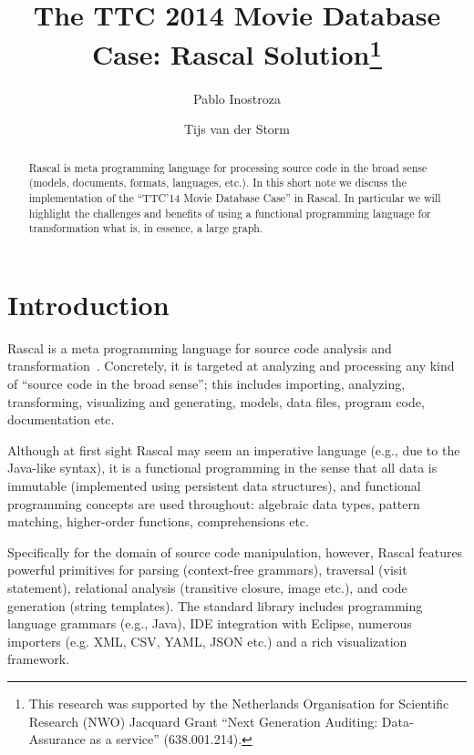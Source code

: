 \documentclass[submission,copyright,creativecommons]{eptcs}
\title{The TTC 2014 Movie Database Case: Rascal Solution\thanks{This
    research was supported by the Netherlands Organisation for
    Scientific Research (NWO) Jacquard Grant ``Next Generation
    Auditing: Data-Assurance as a service'' (638.001.214).}}
\author{Pablo Inostroza \and Tijs van der Storm}
\begin{document}
\maketitle

\begin{abstract}
Rascal is meta programming language for processing source code in the broad sense (models, documents, formats, languages, etc.). In this short note we discuss the implementation of the ``TTC'14 Movie Database Case'' in Rascal. In particular we will highlight the challenges and benefits of using a functional programming language for transformation what is, in essence, a large graph. 
\end{abstract}

\section*{Introduction}

Rascal is a meta programming language for source code analysis and transformation~\cite{Rascal,RascalGTTSE}. 
Concretely, it is targeted at analyzing and processing any kind of ``source code in the broad sense''; this includes importing, analyzing, transforming, visualizing and generating, models, data files, program code, documentation etc.
 
Although at first sight Rascal may seem an imperative language (e.g., due to the  Java-like syntax), it is a functional programming in the sense that all data is immutable (implemented using persistent data structures), and functional programming concepts are used throughout: algebraic data types, pattern matching, higher-order functions, comprehensions etc. 

Specifically for the domain of source code manipulation, however, Rascal features powerful primitives for parsing (context-free grammars), traversal (visit statement), relational analysis (transitive closure, image etc.), and code generation (string templates). 
The standard library includes programming language grammars (e.g., Java), IDE integration
with Eclipse, numerous importers (e.g. XML, CSV, YAML, JSON etc.) and a rich visualization framework. 
\end{document}
